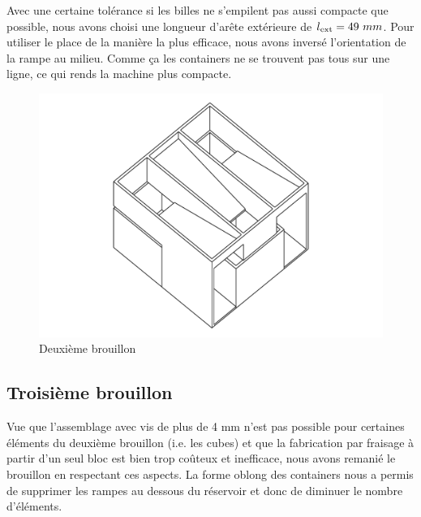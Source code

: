 Avec une certaine tolérance si les billes ne s'empilent pas aussi compacte que possible, nous avons choisi une longueur d'arête extérieure de \({l\textsubscript{ext}=49~mm}\). Pour utiliser le place de la manière la plus efficace, nous avons inversé l'orientation de la rampe au milieu. Comme ça les containers ne se trouvent pas tous sur une ligne, ce qui rends la machine plus compacte. 

\begin{figure}
    \centering
    \includegraphics[width=\textwidth]{Graphics/Reservoir_final/DEUXIEME_BROUILLON.pdf}
    \caption{Deuxième brouillon}
\end{figure}


\subsection{Troisième brouillon}
Vue que l'assemblage avec vis de plus de 4 mm n'est pas possible pour certaines  éléments du deuxième brouillon (i.e. les cubes) et que la fabrication par fraisage à partir d'un seul bloc est bien trop coûteux et inefficace, nous avons remanié le brouillon en respectant ces aspects. La forme oblong des containers nous a permis de supprimer les rampes au dessous du réservoir et donc de diminuer le nombre d'éléments.

